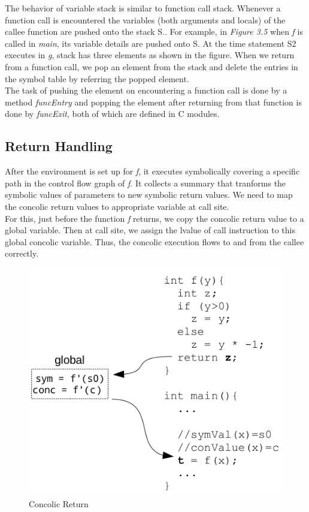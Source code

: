 \documentclass[12pt,oneside]{book}
\begin{document}
The behavior of variable stack is similar to function call stack. Whenever a function call is encountered the variables (both arguments and locals) of the callee function are pushed onto the stack S.. For example, in \textit{Figure 3.5} when \textit{f} is called in \textit{main}, its variable details are pushed onto S. At the time statement S2 executes in \textit{g}, stack has three elements as shown in the figure.
When we return from a function call, we pop an element from the stack and delete the entries in the symbol table by referring the popped element.\\
The task of pushing the element on encountering a function call is done by a method \textit{funcEntry} and popping the element after returning from that function is done by \textit{funcExit}, both of which are defined in C modules.

\subsection{Return Handling}
After the environment is set up for \textit{f}, it executes symbolically covering a specific path in the control flow graph of \textit{f}. It collects a summary that tranforms the symbolic values of parameters to new symbolic return values. We need to map the concolic return values to appropriate variable at call site.\\ 
For this, just before the function \textit{f} returns, we copy the concolic return value to a global variable. Then at call site, we assign the lvalue of call instruction to this global concolic variable. Thus, the concolic execution flows to and from the callee correctly.   

\vspace{0.3cm}
\begin{figure}[htbp]
\centering
\includegraphics[scale=0.40]{return.png}
\caption{Concolic Return}
\end{figure}
\end{document}
